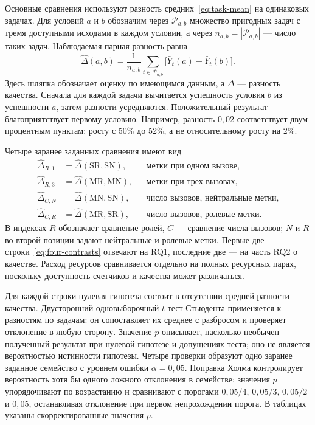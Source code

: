 Основные сравнения используют разность средних~\eqref{eq:task-mean} на одинаковых задачах. Для условий $a$ и $b$ обозначим через $\mathcal{P}_{a,b}$ множество пригодных задач с тремя доступными исходами в каждом условии, а через $n_{a,b}=|\mathcal{P}_{a,b}|$ --- число таких задач. Наблюдаемая парная разность равна
\begin{equation}
\widehat\Delta(a,b)=\frac{1}{n_{a,b}}
\sum_{t\in\mathcal{P}_{a,b}}\bigl[\bar Y_t(a)-\bar Y_t(b)\bigr].
\label{eq:contrast}
\end{equation}
Здесь шляпка обозначает оценку по имеющимся данным, а $\Delta$ --- разность качества. Сначала для каждой задачи вычитается успешность условия $b$ из успешности $a$, затем разности усредняются. Положительный результат благоприятствует первому условию. Например, разность $0{,}02$ соответствует двум процентным пунктам: росту с 50\% до 52\%, а не относительному росту на 2\%.

Четыре заранее заданных сравнения имеют вид
\begin{align}
\widehat\Delta_{R,1}&=\widehat\Delta(\mathrm{SR},\mathrm{SN}),
&&\text{метки при одном вызове},\nonumber\\
\widehat\Delta_{R,3}&=\widehat\Delta(\mathrm{MR},\mathrm{MN}),
&&\text{метки при трех вызовах},\nonumber\\
\widehat\Delta_{C,N}&=\widehat\Delta(\mathrm{MN},\mathrm{SN}),
&&\text{число вызовов, нейтральные метки},\nonumber\\
\widehat\Delta_{C,R}&=\widehat\Delta(\mathrm{MR},\mathrm{SR}),
&&\text{число вызовов, ролевые метки}.
\label{eq:four-contrasts}
\end{align}
В индексах $R$ обозначает сравнение ролей, $C$ --- сравнение числа вызовов; $N$ и $R$ во второй позиции задают нейтральные и ролевые метки. Первые две строки~\eqref{eq:four-contrasts} отвечают на RQ1, последние две --- на часть RQ2 о качестве. Расход ресурсов сравнивается отдельно на полных ресурсных парах, поскольку доступность счетчиков и качества может различаться.

Для каждой строки нулевая гипотеза состоит в отсутствии средней разности качества. Двусторонний одновыборочный $t$-тест Стьюдента применяется к разностям по задачам: он сопоставляет их среднее с разбросом и проверяет отклонение в любую сторону. Значение $p$ описывает, насколько необычен полученный результат при нулевой гипотезе и допущениях теста; оно не является вероятностью истинности гипотезы. Четыре проверки образуют одно заранее заданное семейство с уровнем ошибки $\alpha=0{,}05$. Поправка Холма контролирует вероятность хотя бы одного ложного отклонения в семействе: значения $p$ упорядочивают по возрастанию и сравнивают с порогами $0{,}05/4$, $0{,}05/3$, $0{,}05/2$ и $0{,}05$, останавливая отклонение при первом непрохождении порога. В таблицах указаны скорректированные значения $p$.

